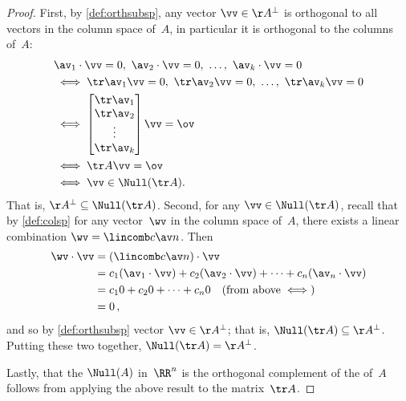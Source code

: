 \begin{proof} 
First, by \cref{def:orthsubsp}, any vector \(\vv\in\AA^\perp\) is orthogonal to all vectors in the column space of~\(A\), in particular it is orthogonal to the columns of~\(A\):
\begin{align*}
& \av_1\cdot\vv=0,\ \av_2\cdot\vv=0,\ \ldots,\ \av_k\cdot\vv=0
\\&\iff \tr\av_1\vv=0,\ \tr\av_2\vv=0,\ \ldots,\ \tr\av_k\vv=0
\\&\iff\begin{bmatrix} \tr\av_1\\\tr\av_2\\\vdots\\\tr\av_k \end{bmatrix}\vv=\ov
\\&\iff \tr A\vv=\ov
\\&\iff\vv\in\Null(\tr A).
\end{align*}
That is, \(\AA^\perp\subseteq\Null(\tr A)\).
Second, for any \(\vv\in\Null(\tr A)\),
recall that by \cref{def:colsp} for any vector~\(\wv\) in the column space of~\(A\), there exists a linear combination \(\wv=\lincomb c\av n\). 
Then
\begin{align*}
\wv\cdot\vv&=(\lincomb c\av n)\cdot\vv
\\&=c_1(\av_1\cdot\vv)+c_2(\av_2\cdot\vv)+\cdots+c_n(\av_n\cdot\vv)
\\&=c_10+c_20+\cdots+c_n0
\quad(\text{from above}\iff)
\\&=0\,,
\end{align*}
and so by \cref{def:orthsubsp} vector \(\vv\in\AA^\perp\); that is, \(\Null(\tr A)\subseteq\AA^\perp\).
Putting these two together, \(\Null(\tr A)=\AA^\perp\).

Lastly, that the \(\Null(A)\) in~\(\RR^n\) is the orthogonal complement of the  of~\(A\) follows from applying the above result to the matrix~\(\tr A\).
\end{proof}



